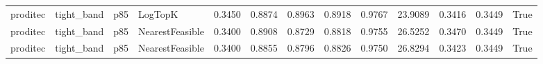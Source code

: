 \begin{tabular}{llllrrrrrrrrl}
proditec &   tight\_band &    p85 &         LogTopK &                     0.3450 &          0.8874 &       0.8963 &   0.8918 &      0.9767 &   23.9089 &              0.3416 &                0.3449 &                   True \\
proditec &   tight\_band &    p85 & NearestFeasible &                     0.3400 &          0.8908 &       0.8729 &   0.8818 &      0.9755 &   26.5252 &              0.3470 &                0.3449 &                   True \\
proditec &   tight\_band &    p85 & NearestFeasible &                     0.3400 &          0.8855 &       0.8796 &   0.8826 &      0.9750 &   26.8294 &              0.3423 &                0.3449 &                   True \\
\bottomrule
\end{tabular}
